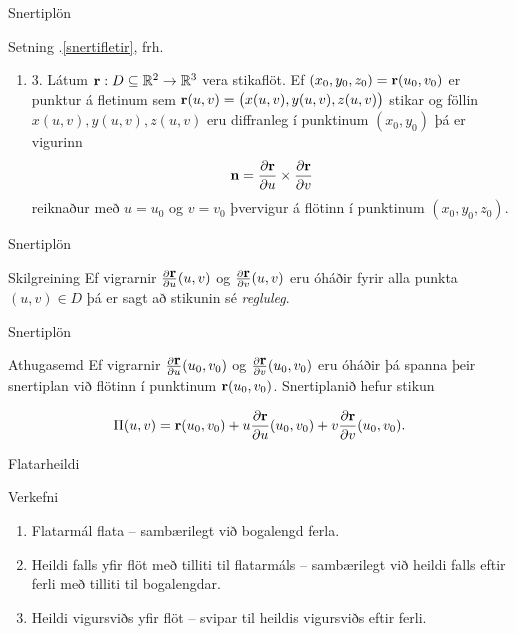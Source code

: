 \begin{frame}{Snertiplön}
 \begin {block}{Setning \kaflanr.\ref{snertifletir}, frh.}
     \begin {enumerate}
    \item [3.] 
  Látum $\mbox{${\bf r}$}: D\subseteq {\mathbb R}^2\rightarrow {\mathbb R}^3$ vera stikaflöt.  
Ef $(x_0, y_0, z_0)=\mbox{${\bf r}$}(u_0, v_0)$ er punktur á fletinum sem 
$\mbox{${\bf r}$}(u,v)=\big(x(u,v), y(u,v), z(u,v)\big)$ stikar og
föllin $x(u,v), y(u,v), z(u,v)$ eru diffranleg í punktinum $(x_0,
y_0)$ þá er vigurinn
     $$\mbox{${\bf n}$} =\frac{\partial \mbox{${\bf r}$}}{\partial u}\times 
\frac{\partial \mbox{${\bf r}$}}{\partial v}$$
reiknaður með $u=u_0$ og $v=v_0$ þvervigur á flötinn í punktinum 
$(x_0, y_0, z_0)$.
\end {enumerate}
 \end {block}

\end{frame}

\begin{frame}{Snertiplön} 

\begin {block}{Skilgreining  \rtask{}}
Ef vigrarnir $\frac{\partial \mbox{${\bf r}$}}{\partial
  u}(u,v)$ og    $\frac{\partial \mbox{${\bf r}$}}{\partial v}(u,v)$ eru óháðir
fyrir alla punkta $(u,v)\in D$ þá er sagt að stikunin sé {\em
  regluleg}. 

 
\end{block}

\end{frame}



\begin{frame}{Snertiplön} 

\begin {block}{Athugasemd \rtask{}}
Ef vigrarnir  
$\frac{\partial \mbox{${\bf r}$}}{\partial u}(u_0,v_0)$ og    $\frac{\partial
  \mbox{${\bf r}$}}{\partial v}(u_0,v_0)$ eru óháðir þá spanna þeir snertiplan við
flötinn í punktinum $\mbox{${\bf r}$}(u_0,v_0)$. Snertiplanið hefur stikun 

$$\Pi(u,v) = \mbox{${\bf r}$}(u_0,v_0)+u\frac{\partial \mbox{${\bf r}$}}{\partial u}(u_0,v_0)
+v\frac{\partial \mbox{${\bf r}$}}{\partial v}(u_0,v_0).$$

\end{block}

\end{frame}


\begin{frame}{Flatarheildi} 

\begin {block}{Verkefni  \rtask{}}
\begin {enumerate}
 \item Flatarmál flata -- sambærilegt við bogalengd ferla.  
\item Heildi falls yfir flöt með tilliti til flatarmáls -- sambærilegt við heildi falls eftir ferli með tilliti til bogalengdar.
\item Heildi vigursviðs yfir flöt -- svipar til heildis vigursviðs eftir ferli. 
 \end {enumerate}



\end{block}

\end{frame}



